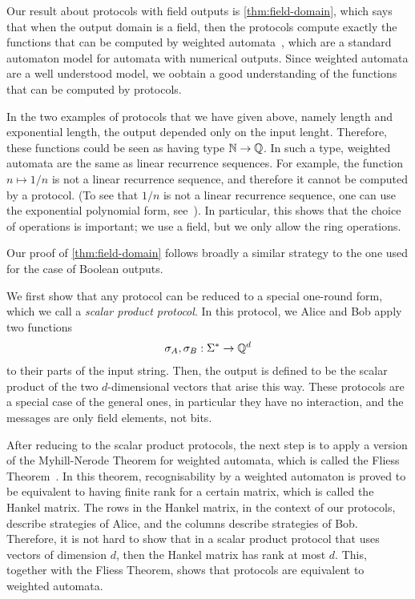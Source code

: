 Our result about protocols with field outputs  is \cref{thm:field-domain}, which says that when the output domain is a field, then the  protocols compute exactly the functions that can be computed by weighted automata~\cite{schutzenberger1961definition}, which are a standard automaton model for automata with numerical outputs. Since weighted automata are a well understood model, we oobtain a good understanding of the functions that can be computed by protocols. 

\begin{myexample}[Division]\label{ex:division}
    In the  two  examples of protocols that we have given above, namely length and exponential length, the output depended only on the input lenght. Therefore, these functions could be seen as having type ${\mathbb N} \to {\mathbb Q}$. In such a type, weighted automata are the same as linear recurrence sequences. For example, the function $n \mapsto 1/n$ is not a linear recurrence sequence, and therefore it cannot be computed by a protocol. (To see that $1/n$ is not a linear recurrence sequence, one can use the exponential polynomial form, see~\cite[Theorem 2.1]{BerstelReutenauer08}). In particular, this shows that the choice of operations is important; we use a field, but we only allow the ring operations.
\end{myexample}

Our proof of \cref{thm:field-domain} follows broadly a similar strategy to the one used for the case of Boolean outputs. 

We first show that any protocol can be reduced to a special one-round form, which we call a \emph{scalar product protocol}. In this protocol, we Alice and Bob apply two functions 
\begin{align*}
\sigma_A, \sigma_B : \Sigma^* \to {\mathbb Q}^d
\end{align*}
to their parts of the input string. Then, the output is defined to be the scalar product of the two $d$-dimensional vectors that arise this way.  These protocols are a special case of the general ones, in particular they have no interaction, and the messages are only field elements, not bits. 

After reducing to the scalar product protocols, the next step is to apply a version of the Myhill-Nerode Theorem for weighted automata, which is called the  Fliess Theorem~\cite{fliess1974}. In this theorem, recognisability by a weighted automaton is proved to be equivalent to having finite rank for a certain matrix, which is called the Hankel matrix. The rows in the Hankel matrix, in the context of our protocols, describe strategies of Alice, and the columns describe strategies of Bob. Therefore, it is not hard to show that in a scalar product protocol that uses vectors of dimension $d$, then the Hankel matrix has rank at most $d$. This, together with the Fliess Theorem, shows that protocols are equivalent to weighted automata. 

